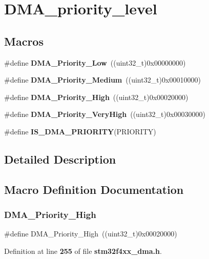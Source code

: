 \section{D\+M\+A\+\_\+priority\+\_\+level}
\label{group__DMA__priority__level}
\subsection*{Macros}
\begin{DoxyCompactItemize}
\item 
\#define \textbf{ D\+M\+A\+\_\+\+Priority\+\_\+\+Low}~((uint32\+\_\+t)0x00000000)
\item 
\#define \textbf{ D\+M\+A\+\_\+\+Priority\+\_\+\+Medium}~((uint32\+\_\+t)0x00010000)
\item 
\#define \textbf{ D\+M\+A\+\_\+\+Priority\+\_\+\+High}~((uint32\+\_\+t)0x00020000)
\item 
\#define \textbf{ D\+M\+A\+\_\+\+Priority\+\_\+\+Very\+High}~((uint32\+\_\+t)0x00030000)
\item 
\#define \textbf{ I\+S\+\_\+\+D\+M\+A\+\_\+\+P\+R\+I\+O\+R\+I\+TY}(P\+R\+I\+O\+R\+I\+TY)
\end{DoxyCompactItemize}


\subsection{Detailed Description}


\subsection{Macro Definition Documentation}
\mbox{\label{group__DMA__priority__level_gae2441c0b4d4ba9945a6f4f7d08045a8e}} 
\subsubsection{D\+M\+A\+\_\+\+Priority\+\_\+\+High}
{\footnotesize\ttfamily \#define D\+M\+A\+\_\+\+Priority\+\_\+\+High~((uint32\+\_\+t)0x00020000)}



Definition at line \textbf{ 255} of file \textbf{ stm32f4xx\+\_\+dma.\+h}.

